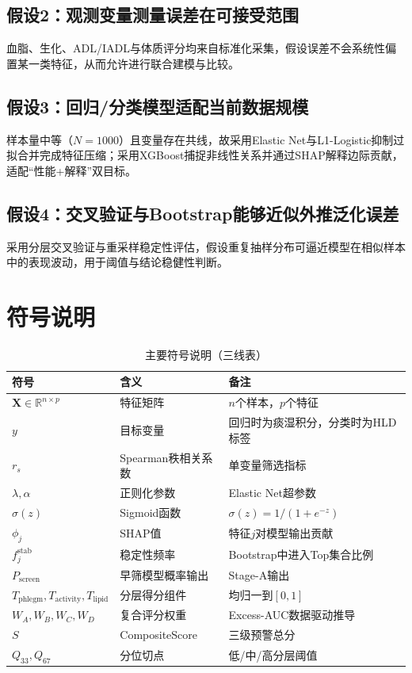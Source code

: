 \documentclass[12pt,a4paper]{ctexart}
\begin{document}
\subsection*{假设2：观测变量测量误差在可接受范围}
血脂、生化、ADL/IADL与体质评分均来自标准化采集，假设误差不会系统性偏置某一类特征，从而允许进行联合建模与比较。

\subsection*{假设3：回归/分类模型适配当前数据规模}
样本量中等（$N=1000$）且变量存在共线，故采用Elastic Net与L1-Logistic抑制过拟合并完成特征压缩；采用XGBoost捕捉非线性关系并通过SHAP解释边际贡献，适配“性能+解释”双目标。

\subsection*{假设4：交叉验证与Bootstrap能够近似外推泛化误差}
采用分层交叉验证与重采样稳定性评估，假设重复抽样分布可逼近模型在相似样本中的表现波动，用于阈值与结论稳健性判断。

\section{符号说明}
\begin{table}[H]
\centering
\caption{主要符号说明（三线表）}
\begin{tabular}{lll}
\toprule
符号 & 含义 & 备注 \\
\midrule
$\mathbf{X}\in\mathbb{R}^{n\times p}$ & 特征矩阵 & $n$个样本，$p$个特征 \\
$y$ & 目标变量 & 回归时为痰湿积分，分类时为HLD标签 \\
$r_s$ & Spearman秩相关系数 & 单变量筛选指标 \\
$\lambda,\alpha$ & 正则化参数 & Elastic Net超参数 \\
$\sigma(z)$ & Sigmoid函数 & $\sigma(z)=1/(1+e^{-z})$ \\
$\phi_j$ & SHAP值 & 特征$j$对模型输出贡献 \\
$f_j^{\mathrm{stab}}$ & 稳定性频率 & Bootstrap中进入Top集合比例 \\
$P_{\mathrm{screen}}$ & 早筛模型概率输出 & Stage-A输出 \\
$T_{\mathrm{phlegm}},T_{\mathrm{activity}},T_{\mathrm{lipid}}$ & 分层得分组件 & 均归一到$[0,1]$ \\
$W_A,W_B,W_C,W_D$ & 复合评分权重 & Excess-AUC数据驱动推导 \\
$S$ & CompositeScore & 三级预警总分 \\
$Q_{33},Q_{67}$ & 分位切点 & 低/中/高分层阈值 \\
\bottomrule
\end{tabular}
\end{table}
\end{document}
